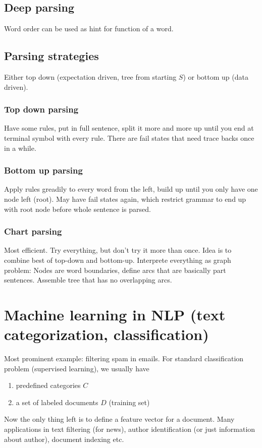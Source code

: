 \documentclass[11pt]{article}
\begin{document}
\subsection{Deep parsing}
Word order can be used as hint for function of a word.

\subsection{Parsing strategies}
Either top down (expectation driven, tree from starting $S$) or bottom up (data driven).

\subsubsection{Top down parsing}
Have some rules, put in full sentence, split it more and more up until you end at
terminal symbol with every rule. There are fail states that need trace backs once in a while.

\subsubsection{Bottom up parsing}
Apply rules greadily to every word from the left, build up until you only have one node
left (root). May have fail states again, which restrict grammar to end up with root
node before whole sentence is parsed.

\subsubsection{Chart parsing}
Most efficient. Try everything, but don't try it more than once. Idea is to combine best 
of top-down and bottom-up. Interprete everything as graph problem: Nodes are word boundaries,
define arcs that are basically part sentences. Assemble tree that has no overlapping
arcs.

\section{Machine learning in NLP (text categorization, classification)}
Most prominent example: filtering spam in emails. For standard classification problem
(supervised learning), we usually have
\begin{enumerate}
	\item predefined categories $C$
	\item a set of labeled documents $D$ (training set)
\end{enumerate}
Now the only thing left is to define a feature vector for a document. Many applications 
in text filtering (for news), author identification (or just information about author),
document indexing etc.
\end{document}
